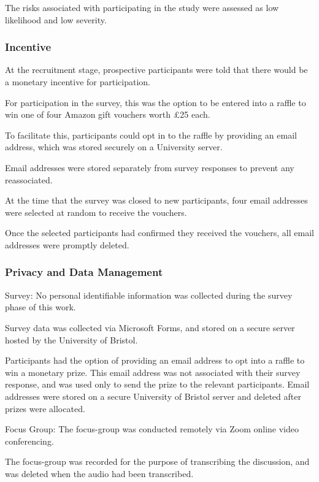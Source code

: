 \documentclass[manuscript,screen,review]{acmart}
\begin{document}
The risks associated with participating in the study were assessed as low likelihood and low severity. 

\subsubsection{Incentive}  


At the recruitment stage, prospective participants were told that there would be a monetary incentive for participation.

For participation in the survey, this was the option to be entered into a raffle to win one of four Amazon gift vouchers worth £25 each.

To facilitate this, participants could opt in to the raffle by providing an email address, which was stored securely on a University server. 

Email addresses were stored separately from survey responses to prevent any reassociated. 

At the time that the survey was closed to new participants, four email addresses were selected at random to receive the vouchers.

Once the selected participants had confirmed they received the vouchers, all email addresses were promptly deleted. 



\subsubsection{Privacy and Data Management}  


Survey:
No personal identifiable information was collected during the survey phase of this work.

Survey data was collected via Microsoft Forms, and stored on a secure server hosted by the University of Bristol.

Participants had the option of providing an email address to opt into a raffle to win a monetary prize. 
This email address was not associated with their survey response, and was used only to send the prize to the relevant participants. 
Email addresses were stored on a secure University of Bristol server and deleted after prizes were allocated.  

Focus Group:
The focus-group was conducted remotely via Zoom online video conferencing. 

The focus-group was recorded for the purpose of transcribing the discussion, and was deleted when the audio had been transcribed. 
\end{document}
